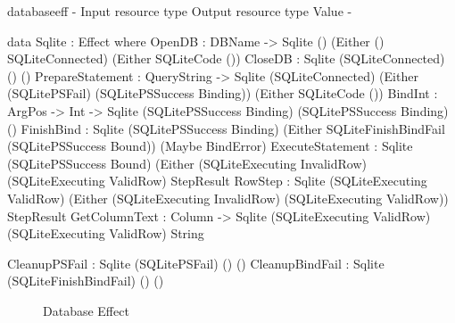 \begin{SaveVerbatim}{databaseeff}
{-                           { Input resource type }    { Output resource type }             { Value }           -}

data Sqlite : Effect where
  OpenDB            : DBName -> 
                      Sqlite ()                         (Either () SQLiteConnected)          (Either SQLiteCode ())
  CloseDB           : Sqlite (SQLiteConnected)          ()                                   ()
  PrepareStatement  : QueryString -> 
                      Sqlite (SQLiteConnected)          (Either (SQLitePSFail) 
                                                          (SQLitePSSuccess Binding))         (Either SQLiteCode ())
  BindInt           : ArgPos -> Int -> 
                      Sqlite (SQLitePSSuccess Binding)  (SQLitePSSuccess Binding)            ()
  FinishBind        : Sqlite (SQLitePSSuccess Binding)  (Either SQLiteFinishBindFail
                                                          (SQLitePSSuccess Bound))           (Maybe BindError)
  ExecuteStatement  : Sqlite (SQLitePSSuccess Bound)    (Either (SQLiteExecuting InvalidRow)
                                                          (SQLiteExecuting ValidRow)         StepResult
  RowStep           : Sqlite (SQLiteExecuting ValidRow) (Either (SQLiteExecuting InvalidRow)
                                                          (SQLiteExecuting ValidRow))        StepResult
  GetColumnText     : Column -> 
                      Sqlite (SQLiteExecuting ValidRow) (SQLiteExecuting ValidRow)           String
                      
  CleanupPSFail     : Sqlite (SQLitePSFail)             ()                                   ()
  CleanupBindFail   : Sqlite (SQLiteFinishBindFail)     ()                                   ()

\end{SaveVerbatim}

\begin{figure*}[t]
\begin{center}
\end{center}
\caption{Database Effect}
\label{fig:dbeffect}
\end{figure*}


